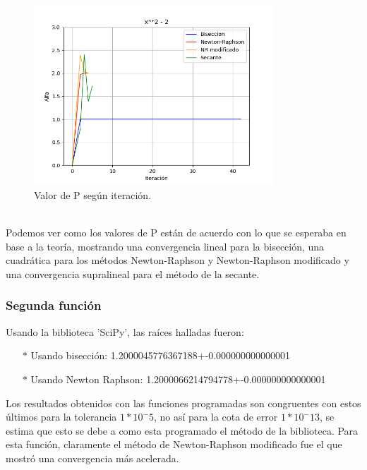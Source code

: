 \documentclass[titlepage,a4paper]{article}
\begin{document}
\begin{figure}[H]
\centering
\includegraphics[width=0.8\textwidth]{alfa f1.png}
\caption{\label{fig:class01}Valor de P según iteración.}
\end{figure}
\\Podemos ver como los valores de P están de acuerdo con lo que se esperaba en base a la teoría, mostrando una convergencia lineal para la bisección, una cuadrática para los métodos Newton-Raphson y Newton-Raphson modificado y una convergencia supralineal para el método de la secante.
\subsubsection{Segunda función}\label{sec:CR2}

Usando la biblioteca 'SciPy', las raíces halladas fueron:
\begin{itemize}
    \item[$*$]Usando bisección:   1.2000045776367188+-0.000000000000001
    \item[$*$]Usando Newton Raphson:  1.2000066214794778+-0.000000000000001
\end{itemize}

Los resultados obtenidos con las funciones programadas son congruentes con estos últimos para la tolerancia $1*10^-5$, no así para la cota de error $1*10^-13$, se estima que esto se debe a como esta programado el método de la biblioteca. Para esta función, claramente el método de Newton-Raphson modificado fue el que mostró una convergencia más acelerada. 
\end{document}
